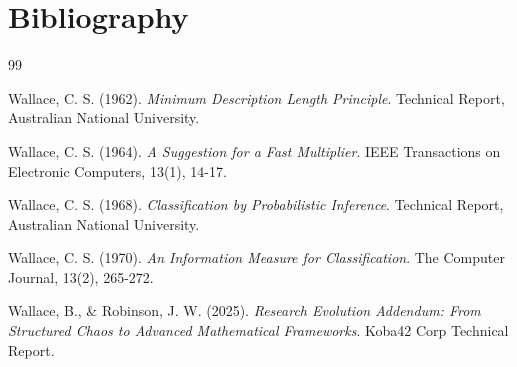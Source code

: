 \documentclass[12pt]{article}
\begin{document}
\section{Bibliography}

\begin{thebibliography}{99}

Wallace, C. S. (1962). \textit{Minimum Description Length Principle}. Technical Report, Australian National University.

Wallace, C. S. (1964). \textit{A Suggestion for a Fast Multiplier}. IEEE Transactions on Electronic Computers, 13(1), 14-17.

Wallace, C. S. (1968). \textit{Classification by Probabilistic Inference}. Technical Report, Australian National University.

Wallace, C. S. (1970). \textit{An Information Measure for Classification}. The Computer Journal, 13(2), 265-272.

Wallace, B., \& Robinson, J. W. (2025). \textit{Research Evolution Addendum: From Structured Chaos to Advanced Mathematical Frameworks}. Koba42 Corp Technical Report.

\end{thebibliography}
\end{document}
